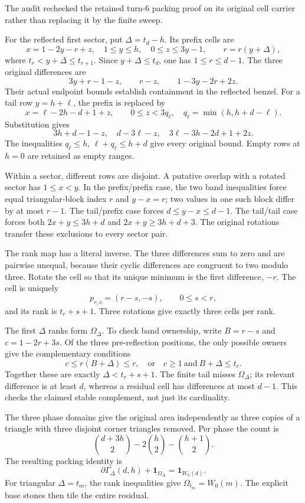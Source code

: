 \documentclass[
  11pt,
]{article}
\begin{document}
The audit rechecked the retained turn-6 packing proof on its original
cell carrier rather than replacing it by the finite sweep.

For the reflected first sector, put \(\Delta=t_d-h\). Its prefix cells
are \[
x=1-2y-r+z,\quad 1\le y\le h,\quad 0\le z\le3y-1,
\qquad r=r(y+\Delta),
\] where \(t_r<y+\Delta\le t_{r+1}\). Since \(y+\Delta\le t_d\), one has
\(1\le r\le d-1\). The three original differences are \[
3y+r-1-z,\qquad r-z,\qquad1-3y-2r+2z.
\] Their actual endpoint bounds establish containment in the reflected
benzel. For a tail row \(y=h+\ell\), the prefix is replaced by \[
x=\ell-2h-d+1+z,\qquad 0\le z<3q_\ell,
\quad q_\ell=\min(h,h+d-\ell).
\] Substitution gives \[
3h+d-1-z,\quad d-3\ell-z,\quad
3\ell-3h-2d+1+2z.
\] The inequalities \(q_\ell\le h\), \(\ell+q_\ell\le h+d\) give every
original bound. Empty rows at \(h=0\) are retained as empty ranges.

Within a sector, different rows are disjoint. A putative overlap with a
rotated sector has \(1\le x<y\). In the prefix/prefix case, the two band
inequalities force equal triangular-block index \(r\) and \(y-x=r\); two
values in one such block differ by at most \(r-1\). The tail/prefix case
forces \(d\le y-x\le d-1\). The tail/tail case forces both
\(2x+y\le3h+d\) and \(2x+y\ge3h+d+3\). The original rotations transfer
these exclusions to every sector pair.

The rank map has a literal inverse. The three differences sum to zero
and are pairwise unequal, because their cyclic differences are congruent
to two modulo three. Rotate the cell so that its unique minimum is the
first difference, \(-r\). The cell is uniquely \[
p_{r,s}=(r-s,-s),\qquad0\le s<r,
\] and its rank is \(t_r+s+1\). Three rotations give exactly three cells
per rank.

The first \(\Delta\) ranks form \(\Omega_\Delta\). To check band
ownership, write \(B=r-s\) and \(c=1-2r+3s\). Of the three
pre-reflection positions, the only possible owners give the
complementary conditions \[
c\le r(B+\Delta)\le r,
\quad\text{or}\quad c\ge1\ \text{and}\ B+\Delta\le t_c.
\] Together these are exactly \(\Delta< t_r+s+1\). The finite tail
misses \(\Omega_\Delta\); its relevant difference is at least \(d\),
whereas a residual cell has differences at most \(d-1\). This checks the
claimed stable complement, not just its cardinality.

The three phase domains give the original area independently as three
copies of a triangle with three disjoint corner triangles removed. Per
phase the count is \[
\binom{d+3h}{2}-2\binom h2-\binom{h+1}{2}.
\] The resulting packing identity is \[
\partial\Gamma_\Delta(d,h)+\mathbf1_{\Omega_\Delta}
=\mathbf1_{W_h(d)}.
\] For triangular \(\Delta=t_m\), the rank inequalities give
\(\Omega_{t_m}=W_0(m)\). The explicit base stones then tile the entire
residual.
\end{document}
